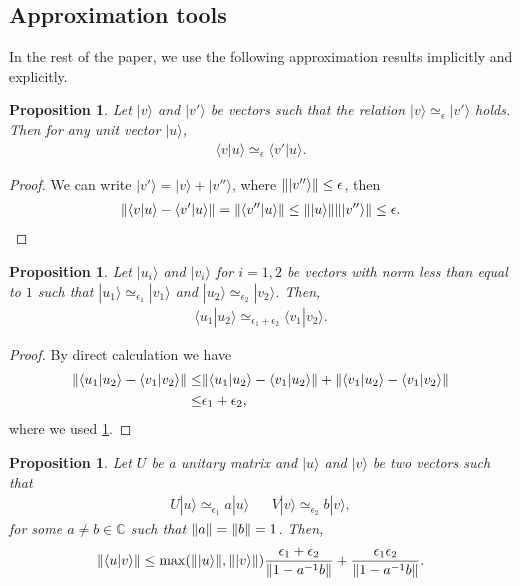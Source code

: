 \documentclass[11pt,letterpaper]{article}
\newcommand{\ket}[1]{|#1\rangle}
\newcommand{\braket}[2]{\langle#1|#2\rangle}
\DeclarePairedDelimiter{\norm}{\lVert}{\rVert}
\newcommand{\C}{\mathbb{C}}
\newcommand{\1}{\mathbb{1}}
\newcommand{\ep}{\epsilon}
\newcommand{\appd}[1]{\simeq_{#1}}
\newtheorem{proposition}[theorem]{Proposition}
\theoremstyle{definition}
\begin{document}
\subsection{Approximation tools}
In the rest of the paper, we use the following approximation results implicitly and explicitly.
\begin{proposition}
	\label{prop:inner_pd}
	Let $\ket{v}$ and $\ket{v'}$ be vectors such that the relation $\ket{v} \appd{\epsilon} \ket{v'}$ holds.
	Then for any unit vector $\ket{u}$,
	\begin{align*}
		 \braket{v}{u} \appd{\ep} \braket{v'}{u}.
	\end{align*}	
\end{proposition}
\begin{proof}
	We can write $\ket{v'} = \ket{v} + \ket{v''}$, where $\norm{\ket{v''}} \leq \epsilon$,
	then
	\begin{align*}
	\norm{ \braket{v}{u} - \braket{v'}{u} } = \norm{\braket{v''}{u}} \leq \norm{\ket{u}}\norm{\ket{v''}} \leq \epsilon.
	\end{align*}
\end{proof}
\begin{proposition}
	Let $\ket{u_i}$ and $\ket{v_i}$ for $i = 1,2$ be vectors with norm less than equal to $1$
	such that 
	$\ket{u_1} \appd{\ep_1} \ket{v_1}$ and $\ket{u_2} \appd{\ep_2} \ket{v_2}$.
	Then, 
	\begin{align*}
		\braket{u_1}{u_2} \appd{\ep_1+ \ep_2} \braket{v_1}{v_2}.
	\end{align*}
\end{proposition}
\begin{proof}
	By direct calculation we have
	\begin{align*}
		\norm{ \braket{u_1}{u_2} - \braket{v_1}{v_2}} \leq &\norm{\braket{u_1}{u_2} - \braket{v_1}{u_2}}
		+ \norm{\braket{v_1}{u_2} - \braket{v_1}{v_2}} \\
		\leq & \ep_1 + \ep_2,
	\end{align*}
	where we used \cref{prop:inner_pd}.
\end{proof}
\begin{proposition}
\label{prop:orthog}
	Let $U$ be a unitary matrix and $\ket{u}$ and $\ket{v}$ be two vectors
	such that
	\begin{align*}
		U\ket{u} \appd{\ep_1} a \ket{u} &&
		V\ket{v} \appd{\ep_2} b \ket{v}, 
	\end{align*}
	for some $a \neq b \in \C$ such that $\norm{a} = \norm{b} = 1$. Then,
	\begin{align*}
		\norm{\braket{u}{v}} \leq \max(\norm{\ket{u}}, \norm{\ket{v}})\frac{\ep_1+\ep_2}{\norm{1-a^{-1}b}} + \frac{\ep_1\ep_2}{\norm{1-a^{-1}b}}.
	\end{align*}
\end{proposition}
\end{document}
